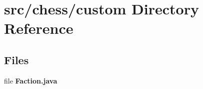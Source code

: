 \section{src/chess/custom Directory Reference}
\label{dir_b0540eb2e0bcb944816c564a8135ce45}
\subsection*{Files}
\begin{DoxyCompactItemize}
\item 
file {\bf Faction.\+java}
\end{DoxyCompactItemize}

